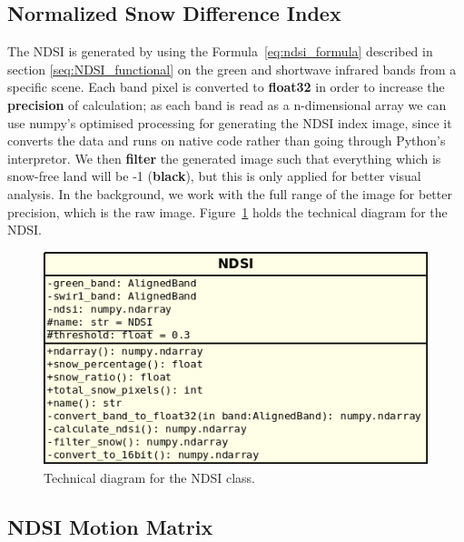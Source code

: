 \documentclass[11pt, a4paper]{report}
\begin{document}
	
	\subsection{Normalized Snow Difference Index}
	\label{seq:ndsi_implementation}

	The NDSI is generated by using the Formula~\ref{eq:ndsi_formula} described in section \ref{seq:NDSI_functional} on the green and shortwave infrared bands from a specific scene. Each band pixel is converted to \textbf{float32} in order to increase the \textbf{precision} of calculation; as each band is read as a n-dimensional array we can use numpy's optimised processing for generating the NDSI index image, since it converts the data and runs on native code rather than going through Python's interpretor. We then \textbf{filter} the generated image such that everything which is snow-free land will be -1 (\textbf{black}), but this is only applied for better visual analysis. In the background, we work with the full range of the image for better precision, which is the raw image. Figure~\ref{fig:ndsi_diagram} holds the technical diagram for the NDSI.
	\begin{figure}[h]
		\centering
		\includegraphics[scale=0.6]{../images/ndsi_diagram.png}
		\caption{Technical diagram for the NDSI class.}
		\label{fig:ndsi_diagram}
	\end{figure}


	\subsection{NDSI Motion Matrix}
	\label{seq:motion_matrix_implementation}
	
\end{document}
